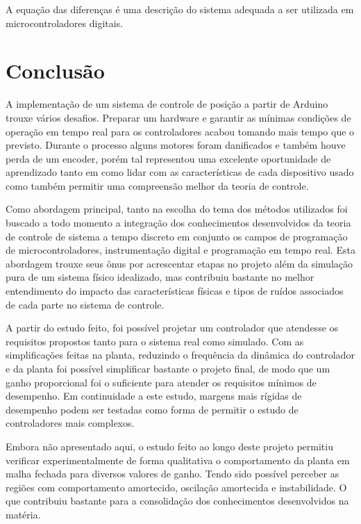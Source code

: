 \documentclass[a4paper,11pt]{article}
\begin{document}
A equação das diferenças é uma descrição do sistema adequada a ser utilizada em microcontroladores digitais.

\section{Conclusão}

A implementação de um sistema de controle de posição a partir de Arduino trouxe vários desafios. Preparar um hardware e garantir as mínimas condições de operação em tempo real para os controladores acabou tomando mais tempo que o previsto. Durante o processo alguns motores foram danificados e também houve perda de um encoder, porém tal representou uma excelente oportunidade de aprendizado tanto em como lidar com as características de cada dispositivo usado como também permitir uma compreensão melhor da teoria de controle.

Como abordagem principal, tanto na escolha do tema dos métodos utilizados foi buscado a todo momento a integração dos conhecimentos desenvolvidos da teoria de controle de sistema a tempo discreto em conjunto os campos de programação de microcontroladores, instrumentação digital e programação em tempo real. Esta abordagem trouxe seus ônus por acrescentar etapas no projeto além da simulação pura de um sistema físico idealizado, mas contribuiu bastante no melhor entendimento do impacto das características físicas e tipos de ruídos associados de cada parte no sistema de controle.


A partir do estudo feito, foi possível projetar um controlador que atendesse os requisitos propostos tanto para o sistema real como simulado. Com as simplificações feitas na planta, reduzindo o frequência da dinâmica do controlador e da planta foi possível simplificar bastante o projeto final, de modo que um ganho proporcional foi o suficiente para atender os requisitos mínimos de desempenho. Em continuidade a este estudo, margens mais rígidas de desempenho podem ser testadas como forma de permitir o estudo de controladores mais complexos.

Embora não apresentado aqui, o estudo feito ao longo deste projeto permitiu verificar experimentalmente de forma qualitativa o comportamento da planta em malha fechada para diversos valores de ganho. Tendo sido possível perceber as regiões com comportamento amortecido, oscilação amortecida e instabilidade. O que contribuiu bastante para a consolidação dos conhecimentos desenvolvidos na matéria.
\end{document}
